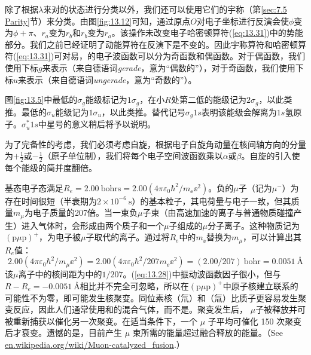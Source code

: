     除了根据$\lambda$来对的状态进行分类以外，我们还可以使用它们的宇称（第\ref{sec:7.5 Parity}节）来分类。由图\ref{fig:13.12}可知，通过原点$O$对电子坐标进行反演会使$\phi$变为$\phi+\pi$、$r_a$变为$r_b$和$r_b$变为$r_a$。该操作未改变电子哈密顿算符(\ref{eq:13.31})中的势能部分。我们之前已经证明了动能算符在反演下是不变的。因此宇称算符和哈密顿算符(\ref{eq:13.31})可对易，的电子波函数可以分为奇函数和偶函数。对于偶函数，我们使用下标$g$来表示（来自德语词\textit{gerade}，意为“偶数的”），对于奇函数，我们使用下标$u$来表示（来自德语词\textit{ungerade}，意为“奇数的”）。

    图\ref{fig:13.5}中最低的$\sigma_g$能级标记为$1\sigma_g$，在小$R$处第二低的能级记为$2\sigma_g$，以此类推。最低的$\sigma_u$能级记为$1\sigma_u$，以此类推。替代记号$\sigma_g1s$表明该能级会解离为$1s$氢原子。$\sigma_u^*1s$中星号的意义稍后将予以说明。

    为了完备性的考虑，我们必须考虑自旋，根据电子自旋角动量在核间轴方向的分量为$+\frac{1}{2}$或$-\frac{1}{2}$（原子单位制），我们将每个电子空间波函数乘以$\alpha$或$\beta$。自旋的引入使每个能级的简并度翻倍。

    基态电子态满足$R_e = 2.00\:\mathrm{bohrs} = 2.00\left(4\pi\varepsilon_0\hbar^2/m_{\ee }\ee ^2\right)$。负的$\mu$子（记为$\mu^-$）为存在时间很短（半衰期为$2\times 10^{-6}\:\mathrm{s}$）的基本粒子，其电荷量与电子一致，但其质量$m_{\mu}$为电子质量的207倍。当一束负$\mu$子束（由高速加速的离子与普通物质碰撞产生）进入气体时，会形成由两个质子和一个$\mu$子组成的$\mu$分子离子。这种物质记为$\left(\mathrm{p}\mu \mathrm{p}\right)^+$，为电子被$\mu$子取代的离子。通过将$R_e$中的$m_{\ee }$替换为$m_{\mu}$，可以计算出其$R_e$值：
    \begin{equation*}
        2.00 \left(4\pi \varepsilon_0 \hbar^2 / m_\mu \ee ^2\right) = 2.00 \left(4\pi \varepsilon_0 \hbar^2 / 207 m_{\ee } \ee ^2\right) = \left(2.00/207\right) \:\mathrm{bohr} = 0.0051 \:\mathrm{Å}
    \end{equation*}
    该$\mu$离子中的核间距为中的$1/207$。(\ref{eq:13.28})中振动波函数因子很小，但与$R - R_e = -0.0051 \:\mathrm{Å}$相比并不完全可忽略，所以在$\left(\mathrm{p}\mu \mathrm{p}\right)^+$中原子核建立联系的可能性不为零，即可能发生核聚变。同位素核（氘）和（氚）比质子更容易发生聚变反应，因此人们通常使用和的混合气体，而不是。聚变发生后， $\mu$子被释放并可被重新捕获以催化另一次聚变。在适当条件下，一个 $\mu$ 子平均可催化 150 次聚变后才衰变。遗憾的是，目前产生 $\mu$ 束所需的能量超过融合释放的能量。（See \url{en.wikipedia.org/wiki/Muon-catalyzed_fusion}.）

